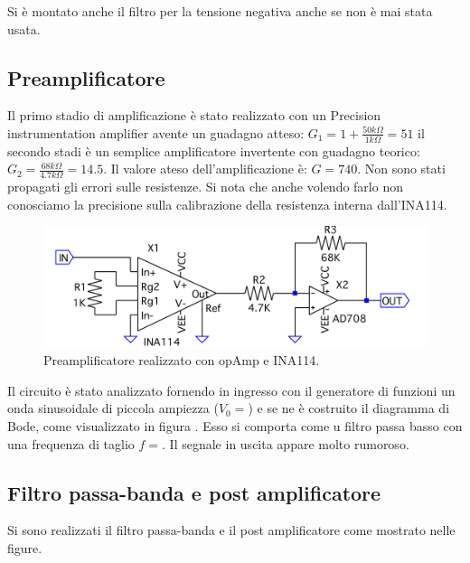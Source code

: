 \documentclass[10pt,a4paper]{article}
\begin{document}
Si è montato anche il filtro per la tensione negativa anche se non è mai stata usata.\\

\subsection{Preamplificatore}
Il primo stadio di amplificazione è stato realizzato con un Precision instrumentation amplifier avente un guadagno atteso: $G_1 = 1+\frac{50 k\Omega}{1 k\Omega} = 51$ il secondo stadi è un semplice amplificatore invertente con guadagno teorico: $G_2 = \frac{68 k\Omega}{4.7 k\Omega} = 14.5$. Il valore ateso dell'amplificazione è: $G = 740$. Non sono stati propagati gli errori sulle resistenze. Si nota che anche volendo farlo non conosciamo la precisione sulla calibrazione della resistenza interna dall'INA114.\\

\begin{figure}[!htb]
\centering
\includegraphics[scale=0.3]{preamp.png}
\caption{Preamplificatore realizzato con opAmp e INA114.\label{preamp}}
\end{figure}

Il circuito è stato analizzato fornendo in ingresso con il generatore di funzioni un onda sinusoidale di piccola ampiezza ($V_0 = $) e se ne è costruito il diagramma di Bode, come visualizzato in figura . Esso si comporta come u filtro passa basso con una frequenza di taglio $f = $. Il segnale in uscita appare molto rumoroso.\\

\subsection{Filtro passa-banda e post amplificatore}
Si sono realizzati il filtro passa-banda e il post amplificatore come mostrato nelle figure.
\end{document}
